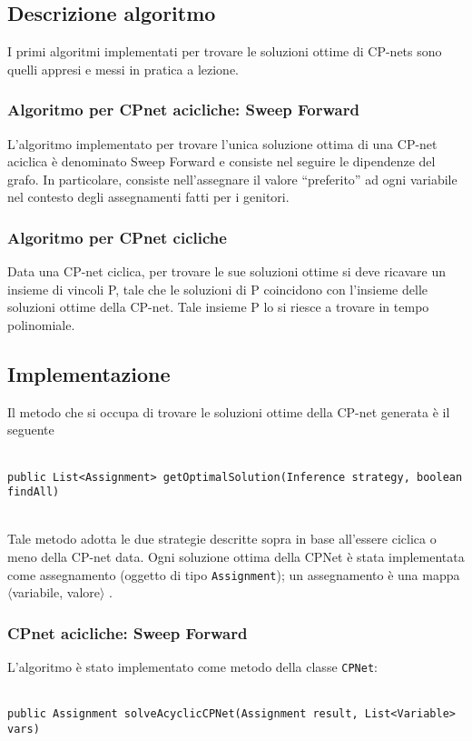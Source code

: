 \subsection{Descrizione algoritmo}
I primi algoritmi implementati per trovare le soluzioni ottime di CP-nets sono quelli appresi e messi in pratica a lezione.

\subsubsection{Algoritmo per CPnet acicliche: Sweep Forward}
L'algoritmo implementato per trovare l'unica soluzione ottima di una CP-net aciclica è denominato Sweep Forward e consiste nel seguire le dipendenze del grafo. In particolare, consiste nell'assegnare il valore ``preferito'' ad ogni variabile nel contesto degli assegnamenti fatti per i genitori.

\subsubsection{Algoritmo per CPnet cicliche}
Data una CP-net ciclica, per trovare le sue soluzioni ottime si deve ricavare un insieme di vincoli P, tale che le soluzioni di P coincidono con l'insieme delle soluzioni ottime della CP-net. Tale insieme P lo si riesce a  trovare in tempo polinomiale.

\subsection{Implementazione}
Il metodo che si occupa di trovare le soluzioni ottime della CP-net generata è il seguente
\\
\\
\centerline{\texttt{public List<Assignment> getOptimalSolution(Inference strategy, boolean findAll)}}
\\

 Tale metodo adotta le due strategie descritte sopra in base all'essere ciclica o meno della CP-net data.
Ogni soluzione ottima della CPNet è stata implementata come assegnamento (oggetto di tipo \texttt{Assignment}); un assegnamento è una mappa $\langle$variabile, valore$\rangle$ .

\subsubsection{CPnet acicliche: Sweep Forward}
L'algoritmo è stato implementato come metodo della classe \texttt{CPNet}:\\
\\
\centerline{\texttt{public Assignment solveAcyclicCPNet(Assignment result, List<Variable> vars)}}
\\


